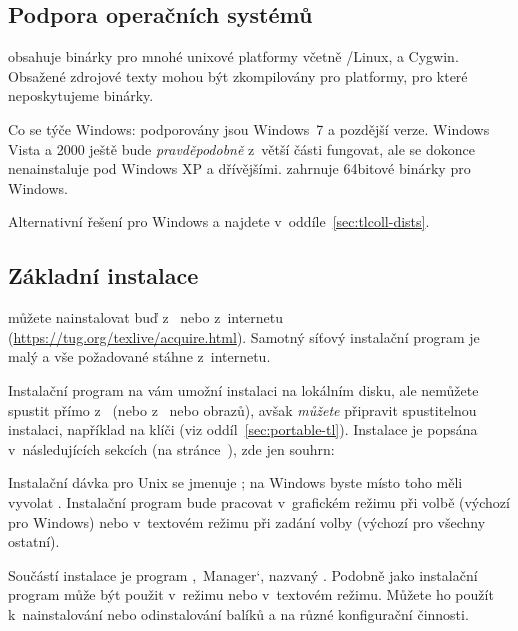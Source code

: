 \documentclass[\classoptions,slovak,english,czech]{\classname}
\newcommand{\singleuv}[1]{,#1`}
\begin{document}
\subsection{Podpora operačních systémů}
\label{sec:os-support}

\TL{} obsahuje binárky pro mnohé unixové platformy
včetně \GNU/Linux, \macOS a Cygwin. 
Obsažené zdrojové texty mohou být zkompilovány
pro platformy, pro které neposkytujeme binárky.

Co se týče Windows: podporovány jsou Windows~7 a pozdější verze.
Windows Vista a 2000 ještě bude \emph{pravděpodobně} z~větší části fungovat,
ale \TL{} se dokonce nenainstaluje pod Windows XP a dřívějšími. 
\TL{} zahrnuje 64bitové binárky pro Windows.
			
Alternativní řešení pro Windows a \macOS{} najdete 
v~oddíle~\ref{sec:tlcoll-dists}.

\subsection{Základní instalace \protect\TL{}}
\label{sec:basic}

\TL{} můžete nainstalovat buď z~\DVD{} nebo z~internetu 
(\url{https://tug.org/texlive/acquire.html}). Samotný síťový
instalační program je malý a vše požadované stáhne z~internetu. 

Instalační program na \DVD{} vám umožní instalaci na lokálním 
disku, ale \TL{} nemůžete spustit přímo z~\TK{} \DVD{} 
(nebo z~\TK{} nebo \TL{}  obrazů), avšak \emph{můžete} připravit
spustitelnou instalaci, například na klíči \USB{} (viz
oddíl~\ref{sec:portable-tl}). Instalace je popsána v~následujících 
sekcích (na stránce~\pageref{sec:install}), zde jen souhrn:
\begin{itemize*}
\item Instalační dávka pro Unix se jmenuje ; na
Windows byste místo toho měli vyvolat .
Instalační program bude pracovat v~grafickém režimu při volbě 
 (výchozí pro Windows) nebo v~textovém režimu
při zadání volby  (výchozí pro všechny ostatní). 

\item Součástí instalace je program
\singleuv{\TL\ Manager}, nazvaný .
Podobně jako instalační program může být použit 
v~režimu \GUI{} nebo v~textovém režimu. 
Můžete ho použít k~nainstalování nebo odinstalování 
balíků a na různé konfigurační činnosti.
\end{itemize*}
\end{document}
